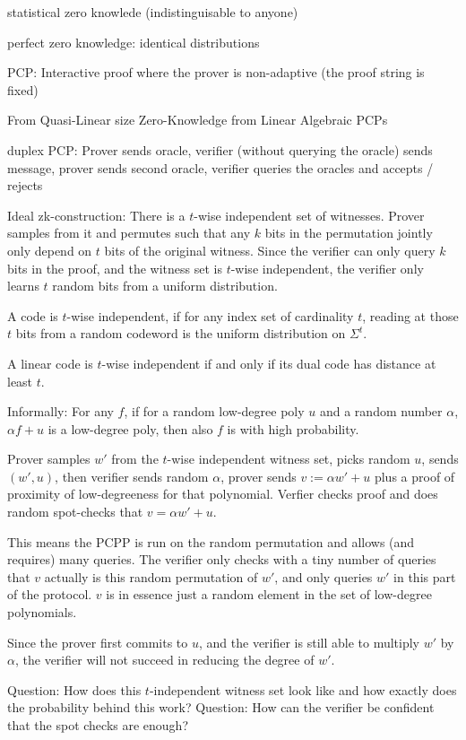\documentclass[11pt,letterpaper]{article}
\begin{document}
statistical zero knowlede (indistinguisable to anyone)

perfect zero knowledge: identical distributions

PCP: Interactive proof where the prover is non-adaptive (the proof string is fixed)

From Quasi-Linear size Zero-Knowledge from Linear Algebraic PCPs

duplex PCP: Prover sends oracle, verifier (without querying the oracle) sends message, prover sends second oracle, verifier queries the oracles and accepts / rejects

Ideal zk-construction: There is a $t$-wise independent set of witnesses. Prover samples from it and permutes such that any $k$ bits
in the permutation jointly only depend on $t$ bits of the original witness. Since the verifier can only query $k$ bits in the proof,
and the witness set is $t$-wise independent, the verifier only learns $t$ random bits from a uniform distribution.

A code is $t$-wise independent, if for any index set of cardinality $t$, reading at those $t$ bits from a random codeword is the uniform distribution on $\Sigma^t$.

A linear code is $t$-wise independent if and only if its dual code has distance at least $t$.


Informally: For any $f$, if for a random low-degree poly $u$ and a random number $\alpha$, $\alpha f+u$ is a low-degree poly, then also $f$ is with high probability.

Prover samples $w'$ from the $t$-wise independent witness set,
picks random $u$, sends $(w', u)$, then verifier sends random $\alpha$, prover sends $v := \alpha w' + u$ plus a proof of proximity of low-degreeness for that polynomial.
Verfier checks proof and does random spot-checks that $v  = \alpha w' + u$.

This means the PCPP is run on the random permutation and allows (and requires) many queries. The verifier only checks with a tiny number
of queries that $v$ actually is this random permutation of $w'$, and only queries $w'$ in this part of the protocol.
$v$ is in essence just a random element in the set of low-degree polynomials.

Since the prover first commits to $u$, and the verifier is still able to multiply $w'$ by $\alpha$, the verifier will not succeed in reducing
the degree of $w'$.

Question: How does this $t$-independent witness set look like and how exactly does the probability behind this work?
Question: How can the verifier be confident that the spot checks are enough?
\end{document}
